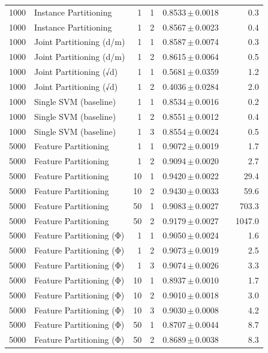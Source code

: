 \begin{table}[ht]
\begin{tabular}{rlrrccr}
1000 & Instance Partitioning & 1 & 1 & 0.8533\,$\pm$\,0.0018 &  & 0.3 \\
1000 & Instance Partitioning & 1 & 2 & 0.8567\,$\pm$\,0.0023 &  & 0.4 \\
1000 & Joint Partitioning (d/m) & 1 & 1 & 0.8587\,$\pm$\,0.0074 &  & 0.3 \\
1000 & Joint Partitioning (d/m) & 1 & 2 & 0.8615\,$\pm$\,0.0064 &  & 0.5 \\
1000 & Joint Partitioning (√d) & 1 & 1 & 0.5681\,$\pm$\,0.0359 &  & 1.2 \\
1000 & Joint Partitioning (√d) & 1 & 2 & 0.4036\,$\pm$\,0.0284 &  & 2.0 \\
1000 & Single SVM (baseline) & 1 & 1 & 0.8534\,$\pm$\,0.0016 &  & 0.2 \\
1000 & Single SVM (baseline) & 1 & 2 & 0.8551\,$\pm$\,0.0012 &  & 0.4 \\
1000 & Single SVM (baseline) & 1 & 3 & 0.8554\,$\pm$\,0.0024 &  & 0.5 \\
5000 & Feature Partitioning & 1 & 1 & 0.9072\,$\pm$\,0.0019 &  & 1.7 \\
5000 & Feature Partitioning & 1 & 2 & 0.9094\,$\pm$\,0.0020 &  & 2.7 \\
5000 & Feature Partitioning & 10 & 1 & 0.9420\,$\pm$\,0.0022 &  & 29.4 \\
5000 & Feature Partitioning & 10 & 2 & 0.9430\,$\pm$\,0.0033 &  & 59.6 \\
5000 & Feature Partitioning & 50 & 1 & 0.9083\,$\pm$\,0.0027 &  & 703.3 \\
5000 & Feature Partitioning & 50 & 2 & 0.9179\,$\pm$\,0.0027 &  & 1047.0 \\
5000 & Feature Partitioning (Φ) & 1 & 1 & 0.9050\,$\pm$\,0.0024 &  & 1.6 \\
5000 & Feature Partitioning (Φ) & 1 & 2 & 0.9073\,$\pm$\,0.0019 &  & 2.5 \\
5000 & Feature Partitioning (Φ) & 1 & 3 & 0.9074\,$\pm$\,0.0026 &  & 3.3 \\
5000 & Feature Partitioning (Φ) & 10 & 1 & 0.8937\,$\pm$\,0.0010 &  & 1.7 \\
5000 & Feature Partitioning (Φ) & 10 & 2 & 0.9010\,$\pm$\,0.0018 &  & 3.0 \\
5000 & Feature Partitioning (Φ) & 10 & 3 & 0.9030\,$\pm$\,0.0008 &  & 4.2 \\
5000 & Feature Partitioning (Φ) & 50 & 1 & 0.8707\,$\pm$\,0.0044 &  & 8.7 \\
5000 & Feature Partitioning (Φ) & 50 & 2 & 0.8689\,$\pm$\,0.0038 &  & 8.3 \\

\end{tabular}
\end{table}
